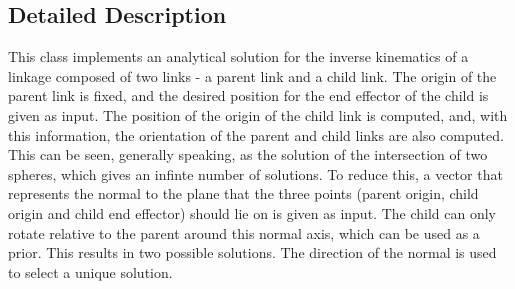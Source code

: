 \subsection{Detailed Description}
This class implements an analytical solution for the inverse kinematics of a linkage composed of two links -\/ a parent link and a child link. The origin of the parent link is fixed, and the desired position for the end effector of the child is given as input. The position of the origin of the child link is computed, and, with this information, the orientation of the parent and child links are also computed. This can be seen, generally speaking, as the solution of the intersection of two spheres, which gives an infinte number of solutions. To reduce this, a vector that represents the normal to the plane that the three points (parent origin, child origin and child end effector) should lie on is given as input. The child can only rotate relative to the parent around this normal axis, which can be used as a prior. This results in two possible solutions. The direction of the normal is used to select a unique solution. 

